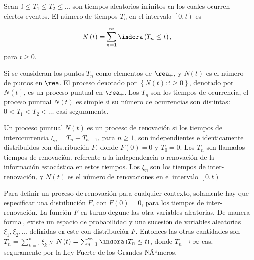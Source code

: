 \begin{Def}%
Sean $0\leq T_{1}\leq T_{2}\leq \ldots$ son tiempos aleatorios infinitos en los cuales ocurren ciertos eventos. El n\'umero de tiempos $T_{n}$ en el intervalo $\left[0,t\right)$ es

\begin{eqnarray}
N\left(t\right)=\sum_{n=1}^{\infty}\indora\left(T_{n}\leq t\right),
\end{eqnarray}
para $t\geq0$.
\end{Def}

Si se consideran los puntos $T_{n}$ como elementos de $\rea_{+}$, y $N\left(t\right)$ es el n\'umero de puntos en $\rea$. El proceso denotado por $\left\{N\left(t\right):t\geq0\right\}$, denotado por $N\left(t\right)$, es un proceso puntual en $\rea_{+}$. Los $T_{n}$ son los tiempos de ocurrencia, el proceso puntual $N\left(t\right)$ es simple si su n\'umero de ocurrencias son distintas: $0<T_{1}<T_{2}<\ldots$ casi seguramente.

\begin{Def}
Un proceso puntual $N\left(t\right)$ es un proceso de renovaci\'on si los tiempos de interocurrencia $\xi_{n}=T_{n}-T_{n-1}$, para $n\geq1$, son independientes e identicamente distribuidos con distribuci\'on $F$, donde $F\left(0\right)=0$ y $T_{0}=0$. Los $T_{n}$ son llamados tiempos de renovaci\'on, referente a la independencia o renovaci\'on de la informaci\'on estoc\'astica en estos tiempos. Los $\xi_{n}$ son los tiempos de inter-renovaci\'on, y $N\left(t\right)$ es el n\'umero de renovaciones en el intervalo $\left[0,t\right)$
\end{Def}


\begin{Note}
Para definir un proceso de renovaci\'on para cualquier contexto, solamente hay que especificar una distribuci\'on $F$, con $F\left(0\right)=0$, para los tiempos de inter-renovaci\'on. La funci\'on $F$ en turno degune las otra variables aleatorias. De manera formal, existe un espacio de probabilidad y una sucesi\'on de variables aleatorias $\xi_{1},\xi_{2},\ldots$ definidas en este con distribuci\'on $F$. Entonces las otras cantidades son $T_{n}=\sum_{k=1}^{n}\xi_{k}$ y $N\left(t\right)=\sum_{n=1}^{\infty}\indora\left(T_{n}\leq t\right)$, donde $T_{n}\rightarrow\infty$ casi seguramente por la Ley Fuerte de los Grandes NÃºmeros.
\end{Note}

%
%

